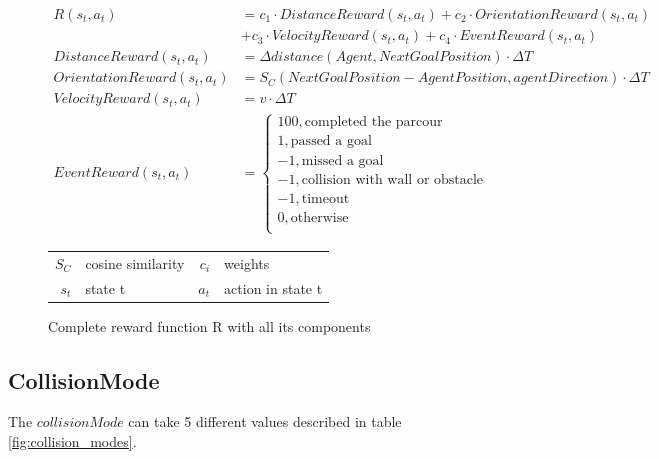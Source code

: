 \begin{figure}
    \centering
    \begin{align}
         R(s_t,a_t) &= c_1 \cdot DistanceReward(s_t,a_t) + c_2 \cdot OrientationReward(s_t,a_t) \nonumber \\
         &  + c_3 \cdot VelocityReward(s_t, a_t) + c_4 \cdot EventReward(s_t, a_t) \nonumber \\
         DistanceReward(s_t,a_t) &= \Delta distance(Agent, NextGoalPosition) \cdot \Delta T \nonumber \\
         OrientationReward(s_t,a_t) &= S_C(NextGoalPosition - AgentPosition, agentDirection) \cdot \Delta T \nonumber \\
         VelocityReward(s_t, a_t) &= v \cdot \Delta T \nonumber \\
         EventReward(s_t, a_t) &= \begin{cases}
              100,           \text{completed the parcour}           \\
              1,             \text{passed a goal}                   \\
              -1,            \text{missed a goal}                   \\
              -1,            \text{collision with wall or obstacle} \\
              -1,            \text{timeout}                         \\
              0,             \text{otherwise}                       \\
         \end{cases} \nonumber
    \end{align}
    \caption{Complete reward function R with all its components}
    \begin{tabular}{r@{: }l r@{: }l}
    $S_C$ & cosine similarity & $c_i$ & weights\\
    $s_t$& state t & $a_t$& action in state t 
    \end{tabular}
    \label{fig:reward_functions}
\end{figure}



\subsection{CollisionMode}

The $collisionMode$ can take 5 different values described in table \ref{fig:collision_modes}.

